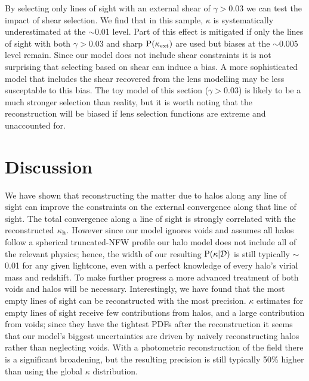 \documentclass[useAMS,usenatbib]{mn2e}
\begin{document}
By selecting only lines of sight with an external shear of $\gamma>0.03$ we
can test the impact of shear selection. We find that in this sample, $\kappa$
is systematically underestimated at the $\sim$0.01 level. Part of this effect
is mitigated if only the lines of sight with both $\gamma>0.03$ and sharp
${\rm P}(\kappa_{\rm ext})$ are used but biases at the $\sim$0.005 level remain. Since our
model does not include shear constraints it is not surprising that selecting
based on shear can induce a bias. A more sophisticated model that includes the
shear recovered from the lens modelling may be less susceptable to this bias.
The toy model of this section ($\gamma>0.03$) is likely to be a much stronger
selection than reality, but it is worth noting that the reconstruction
\proceedure will be biased if lens selection functions are extreme and
unaccounted for.



\section{Discussion}
\label{sec:discuss}

We have shown that reconstructing the matter due to halos along any line
of sight can improve the constraints on the external convergence along
that line of sight. The total convergence along a line of sight is
strongly correlated with the reconstructed $\kappa_{\rm h}$. However since our
model ignores voids and assumes all halos follow a spherical
truncated-NFW profile our halo model does not include all of the relevant
physics; hence, the width of our resulting ${\rm P}(\kappa|{\mathcal{D}})$ is still
typically $\sim$0.01 for any given lightcone, even with a perfect
knowledge of every halo's virial mass and redshift. To make further
progress a more advanced treatment of both voids and halos will be
necessary. Interestingly, we have found that the most empty lines of
sight can be reconstructed with the most precision. $\kappa$ estimates
for empty
lines of sight receive few contributions from halos, and a large
contribution from voids; since they have the tightest PDFs after the
reconstruction it seems that our model's biggest uncertainties are
driven by naively reconstructing halos rather than neglecting voids.
With a photometric reconstruction of the field there is a significant
broadening, but the resulting precision is still typically 50\% 
higher than using the global $\kappa$ distribution. 
\end{document}
